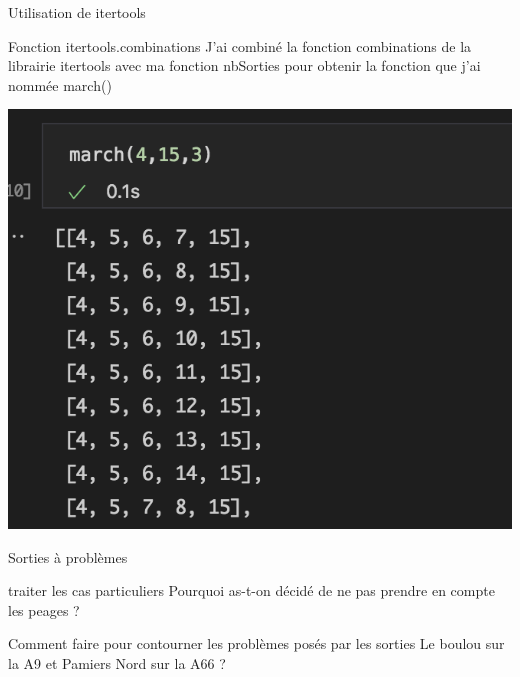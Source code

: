 \documentclass[aspectratio=169]{beamer}
\begin{document}
\begin{frame}{Utilisation de itertools}

\begin{block}{ Fonction itertools.combinations}
J'ai combiné la fonction combinations de la librairie itertools avec ma fonction nbSorties pour obtenir la fonction que j'ai nommée march()
\end{block}

\begin{center}
 \includegraphics[scale=0.45]{fct march.png}
\end{center}


\end{frame}

\begin{frame}{Sorties à problèmes}

\begin{block}{traiter les cas particuliers}
Pourquoi as-t-on décidé de ne pas prendre en compte les peages ?

Comment faire pour contourner les problèmes posés par les sorties Le boulou sur la A9 et Pamiers Nord sur la A66 ?
 
\end{block}
    
\end{frame}
\end{document}
